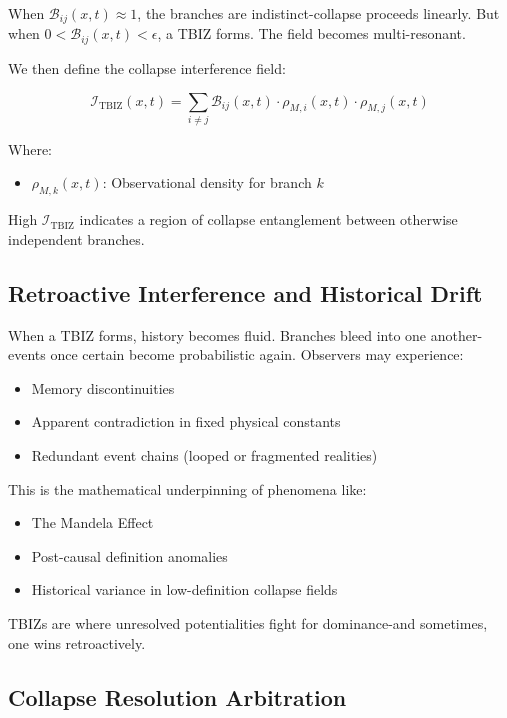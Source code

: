 When \( \mathcal{B}_{ij}(x,t) \approx 1 \), the branches are indistinct-collapse proceeds linearly. But when \( 0 < \mathcal{B}_{ij}(x,t) < \epsilon \), a TBIZ forms. The field becomes multi-resonant.

We then define the collapse interference field:

\begin{equation}
\mathcal{I}_{\text{TBIZ}}(x,t) = \sum_{i \neq j} \mathcal{B}_{ij}(x,t) \cdot \rho_{M,i}(x,t) \cdot \rho_{M,j}(x,t)
\end{equation}

Where:
\begin{itemize}
    \item \( \rho_{M,k}(x,t) \): Observational density for branch \( k \)
\end{itemize}

High \( \mathcal{I}_{\text{TBIZ}} \) indicates a region of collapse entanglement between otherwise independent branches.

\subsection{Retroactive Interference and Historical Drift}

When a TBIZ forms, history becomes fluid. Branches bleed into one another-events once certain become probabilistic again. Observers may experience:
\begin{itemize}
    \item Memory discontinuities
    \item Apparent contradiction in fixed physical constants
    \item Redundant event chains (looped or fragmented realities)
\end{itemize}

This is the mathematical underpinning of phenomena like:
\begin{itemize}
    \item The Mandela Effect
    \item Post-causal definition anomalies
    \item Historical variance in low-definition collapse fields
\end{itemize}

TBIZs are where unresolved potentialities fight for dominance-and sometimes, one wins retroactively.

\subsection{Collapse Resolution Arbitration}

